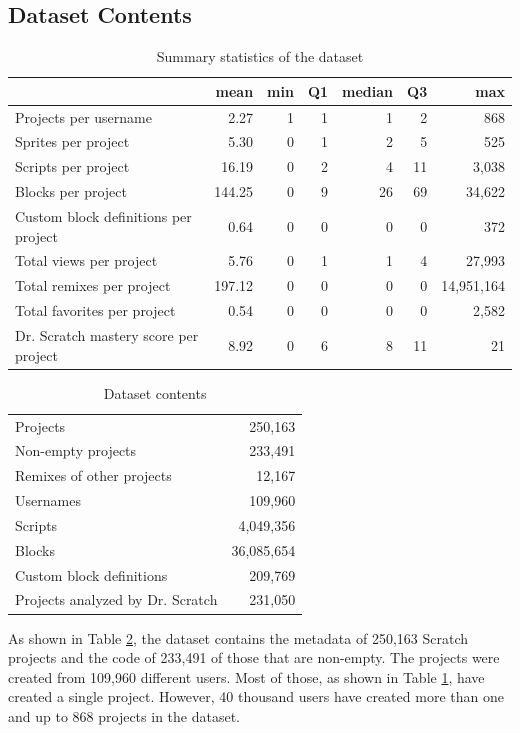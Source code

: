 \documentclass[10pt, conference]{IEEEtran}
\begin{document}
\subsection{Dataset Contents}

\begin{table}[]
	\centering
	\begin{tabular}{lrrrrrr}
		&\textbf{mean}&\textbf{min}&\textbf{Q1}&\textbf{median}&\textbf{Q3}&\textbf{max}\\
		\hline
		Projects per username&2.27&1&1&1&2&868\\
		Sprites per project&5.30&0&1&2&5&525\\
		Scripts per project&16.19&0&2&4&11&3,038\\
		Blocks per project&144.25&0&9&26&69&34,622\\
		Custom block definitions per project&0.64&0&0&0&0&372\\
		Total views per project&5.76&0&1&1&4&27,993\\
		Total remixes per project&197.12&0&0&0&0&14,951,164\\
		Total favorites per project&0.54&0&0&0&0&2,582\\
		Dr. Scratch mastery score per project&8.92&0&6&8&11&21\\
		\hline
	\end{tabular}
	\caption{Summary statistics of the dataset}
	\label{tbl-stats}
\end{table}

\begin{table}[]
	\centering
	\begin{tabular}{lr}
		\hline
		Projects & 250,163 \\
		Non-empty projects & 233,491 \\
		Remixes of other projects & 12,167 \\
		Usernames & 109,960 \\
		Scripts & 4,049,356 \\
		Blocks & 36,085,654 \\
		Custom block definitions & 209,769 \\
		Projects analyzed by Dr. Scratch & 231,050 \\
		\hline
	\end{tabular}
	\caption{Dataset contents}
	\label{tbl-size}
\end{table}

As shown in Table \ref{tbl-size}, the dataset contains the metadata of 250,163 Scratch projects and the code of 233,491 of those that are non-empty.
The projects were created from 109,960 different users.
Most of those, as shown in Table \ref{tbl-stats}, have created a single project.
However, 40 thousand users have created more than one and up to 868 projects in the dataset.
\end{document}

